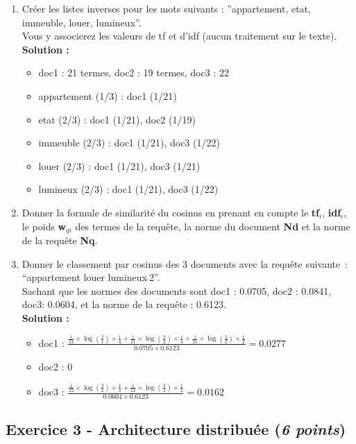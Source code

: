 \documentclass[9pt,a4paper]{article}
\newenvironment{solution}[0]{
~\\ \color{red} \textbf{Solution :}\color{black}}{%
}
\begin{document}
\begin{enumerate}
  \item[8.] Cr\'eer les listes inverses pour les mots suivants : ''appartement, etat, immeuble, louer, lumineux''.\\
  Vous y associerez les valeurs de tf et d'idf (aucun traitement sur le texte).
\begin{solution}
\begin{itemize}
  \item doc1 : 21 termes, doc2 : 19 termes, doc3 : 22
  \item appartement (1/3) : doc1 (1/21)
  \item etat (2/3) : doc1 (1/21), doc2 (1/19)
  \item immeuble (2/3) : doc1 (1/21), doc3 (1/22)
  \item louer (2/3) : doc1 (1/21), doc3 (1/21)
  \item lumineux (2/3) : doc1 (1/21), doc3 (1/22)
\end{itemize}
\end{solution}

  \item[9.] Donner la formule de similarité du cosinus en prenant en compte le {\bf tf$_i$}, {\bf idf$_i$}, le poids {\bf w$_{qi}$} des termes de la requête, la norme du document {\bf Nd} et la norme de la requête {\bf Nq}.

  \item[10.] Donner le classement par cosinus des 3 documents avec la requête suivante~: ``appartement louer lumineux$\hat{~}$2''.\\
  Sachant que les normes des documents sont doc1 : 0.0705, doc2 : 0.0841, doc3: 0.0604, et la norme de la requête : 0.6123.
\begin{solution}
\begin{itemize}
  \item doc1 : $\frac{\frac{1}{21} \times \log(\frac{3}{1}) \times \frac{1}{4} + \frac{1}{21} \times \log(\frac{3}{2}) \times \frac{1}{4} + \frac{1}{21} \times \log(\frac{3}{2}) \times \frac{1}{2}}{0.0705 \times 0.6123}  = 0.0277$ 
  \item doc2 : $0$
  \item doc3 : $\frac{\frac{1}{22} \times \log(\frac{3}{2}) \times \frac{1}{4} + \frac{1}{22} \times \log(\frac{3}{2}) \times \frac{1}{2}}{0.0604 \times 0.6123} = 0.0162$
\end{itemize}
\end{solution}
\end{enumerate}
\subsection*{Exercice 3 - Architecture distribuée ({\it 6 points})}
\end{document}
